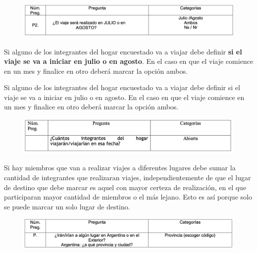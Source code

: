 \documentclass[
  openany]{book}
\begin{document}
\begin{figure}

{\centering \includegraphics[width=1\linewidth]{imagenes/figura6-306} 

}

\end{figure}

Si alguno de los integrantes del hogar encuestado va a viajar debe definir \textbf{si el viaje se va a iniciar en julio o en agosto}. En el caso en que el viaje comience en un mes y finalice en otro deberá marcar la opción ambos.

Si alguno de los integrantes del hogar encuestado va a viajar debe definir si el viaje se va a iniciar en julio o en agosto. En el caso en que el viaje comience en un mes y finalice en otro deberá marcar la opción ambos.

\begin{figure}

{\centering \includegraphics[width=1\linewidth]{imagenes/figura6-307} 

}

\end{figure}

Si hay miembros que van a realizar viajes a diferentes lugares debe sumar la cantidad de integrantes que realizaran viajes, independientemente de que el lugar de destino que debe marcar es aquel con mayor certeza de realización, en el que participaran mayor cantidad de miembros o el más lejano. Esto es así porque solo se puede marcar un solo lugar de destino.

\begin{figure}

{\centering \includegraphics[width=1\linewidth]{imagenes/figura6-308} 

}

\end{figure}
\end{document}
